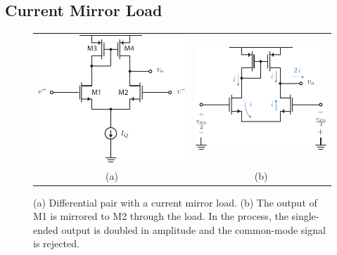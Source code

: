 \subsection{Current Mirror Load} \label{sec:cur_mir_load}
\begin{figure}[tb]
\centering
\begin{tabular}{cc}
\includegraphics[scale=1]{Diffpair_se_output.pdf} &
\includegraphics[scale=1]{Diffpair_se_ac.pdf}\\
(a) & (b)\\
\end{tabular}
\caption{(a) Differential pair with a current mirror load.  (b) The output of M1 is mirrored to M2 through the load. In the process, the single-ended output is doubled in amplitude and the common-mode signal is rejected.}
\label{fig:Diffpair_se_output.pdf}
\end{figure}
